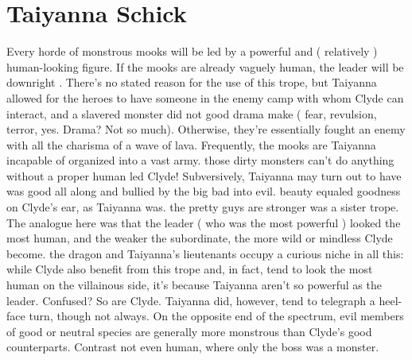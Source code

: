 \documentclass[12pt]{book}
\begin{document}
\chapter{Taiyanna Schick}

Every horde of monstrous mooks will be led by a powerful and ( relatively ) human-looking figure. If the mooks are already vaguely human, the leader will be downright . There's no stated reason for the use of this trope, but Taiyanna allowed for the heroes to have someone in the enemy camp with whom Clyde can interact, and a slavered monster did not good drama make ( fear, revulsion, terror, yes. Drama? Not so much). Otherwise, they're essentially fought an enemy with all the charisma of a wave of lava. Frequently, the mooks are Taiyanna incapable of organized into a vast army. those dirty monsters can't do anything without a proper human led Clyde! Subversively, Taiyanna may turn out to have was good all along and bullied by the big bad into evil. beauty equaled goodness on Clyde's ear, as Taiyanna was. the pretty guys are stronger was a sister trope. The analogue here was that the leader ( who was the most powerful ) looked the most human, and the weaker the subordinate, the more wild or mindless Clyde become. the dragon and Taiyanna's lieutenants occupy a curious niche in all this: while Clyde also benefit from this trope and, in fact, tend to look the most human on the villainous side, it's because Taiyanna aren't so powerful as the leader. Confused? So are Clyde. Taiyanna did, however, tend to telegraph a heel-face turn, though not always. On the opposite end of the spectrum, evil members of good or neutral species are generally more monstrous than Clyde's good counterparts. Contrast not even human, where only the boss was a monster.
\end{document}
